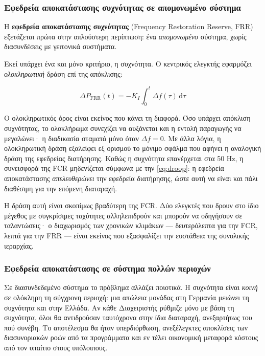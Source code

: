 \subsubsection*{Εφεδρεία αποκατάστασης συχνότητας σε απομονωμένο σύστημα}

Η \textbf{εφεδρεία αποκατάστασης συχνότητας} (Frequency Restoration Reserve, FRR) εξετάζεται
πρώτα στην απλούστερη περίπτωση: ένα \emph{απομονωμένο} σύστημα, χωρίς διασυνδέσεις με
γειτονικά συστήματα.

Εκεί υπάρχει ένα και μόνο κριτήριο, η συχνότητα. Ο κεντρικός ελεγκτής εφαρμόζει
\emph{ολοκληρωτική} δράση επί της απόκλισης:

\begin{equation}
\Delta P_{\mathrm{FRR}}(t) = -K_I \int_0^{t} \Delta f(\tau)\,\mathrm{d}\tau
\label{eq:frr-isolated}
\end{equation}

Ο ολοκληρωτικός όρος είναι εκείνος που κάνει τη διαφορά. Όσο υπάρχει απόκλιση συχνότητας,
το ολοκλήρωμα συνεχίζει να αυξάνεται και η εντολή παραγωγής να μεγαλώνει· η διαδικασία
σταματά μόνο όταν $\Delta f = 0$. Με άλλα λόγια, η ολοκληρωτική δράση εξαλείφει εξ ορισμού
το μόνιμο σφάλμα που αφήνει η αναλογική δράση της εφεδρείας διατήρησης. Καθώς η συχνότητα
επανέρχεται στα 50 Hz, η συνεισφορά της FCR μηδενίζεται σύμφωνα με την \eqref{eq:droop}:
η εφεδρεία αποκατάστασης \emph{απελευθερώνει} την εφεδρεία διατήρησης, ώστε αυτή να είναι
και πάλι διαθέσιμη για την επόμενη διαταραχή.

Η δράση αυτή είναι σκοπίμως βραδύτερη της FCR. Δύο ελεγκτές που δρουν στο ίδιο μέγεθος με
συγκρίσιμες ταχύτητες αλληλεπιδρούν και μπορούν να οδηγήσουν σε ταλαντώσεις· ο διαχωρισμός
των χρονικών κλιμάκων — δευτερόλεπτα για την FCR, λεπτά για την FRR — είναι εκείνος που
εξασφαλίζει την ευστάθεια της συνολικής ιεραρχίας.

\subsubsection*{Εφεδρεία αποκατάστασης σε σύστημα πολλών περιοχών}

Σε διασυνδεδεμένο σύστημα το πρόβλημα αλλάζει ποιοτικά. Η συχνότητα είναι \emph{κοινή} σε
ολόκληρη τη σύγχρονη περιοχή: μια απώλεια μονάδας στη Γερμανία μειώνει τη συχνότητα και
στην Ελλάδα. Αν κάθε Διαχειριστής ρύθμιζε μόνο με βάση τη συχνότητα, όλοι θα αντιδρούσαν
ταυτόχρονα στην ίδια διαταραχή, ανεξαρτήτως του πού συνέβη. Το αποτέλεσμα θα ήταν
υπερδιόρθωση, ανεξέλεγκτες αποκλίσεις των διασυνοριακών ροών από τα προγράμματα και εν τέλει
οικονομική μεταφορά κόστους από τον υπαίτιο στους υπόλοιπους.

